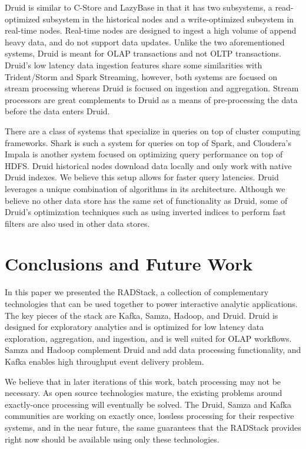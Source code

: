 \documentclass{vldb}
\begin{document}
Druid is similar to C-Store\cite{stonebraker2005c} and
LazyBase\cite{cipar2012lazybase} in that it has two subsystems, a
read-optimized subsystem in the historical nodes and a write-optimized
subsystem in real-time nodes. Real-time nodes are designed to ingest a high
volume of append heavy data, and do not support data updates. Unlike the two
aforementioned systems, Druid is meant for OLAP transactions and not OLTP
transactions. Druid’s low latency data ingestion features share some
similarities with Trident/Storm\cite{marz2013storm} and Spark
Streaming\cite{zaharia2012discretized}, however, both systems are focused on
stream processing whereas Druid is focused on ingestion and aggregation. Stream
processors are great complements to Druid as a means of pre-processing the data
before the data enters Druid. 

There are a class of systems that specialize in queries on top of cluster
computing frameworks. Shark\cite{engle2012shark} is such a system for queries
on top of Spark, and Cloudera’s Impala\cite{cloudera2013} is another system
focused on optimizing query performance on top of HDFS. Druid historical nodes
download data locally and only work with native Druid indexes. We believe this
setup allows for faster query latencies. Druid leverages a unique combination
of algorithms in its architecture. Although we believe no other data store has
the same set of functionality as Druid, some of Druid’s optimization techniques
such as using inverted indices to perform fast filters are also used in other
data stores\cite{macnicol2004sybase}. 

\section{Conclusions and Future Work}
\label{sec:conclusions}
In this paper we presented the RADStack, a collection of complementary
technologies that can be used together to power interactive analytic
applications. The key pieces of the stack are Kafka, Samza, Hadoop, and Druid.
Druid is designed for exploratory analytics and is optimized for low latency
data exploration, aggregation, and ingestion, and is well suited for OLAP
workflows. Samza and Hadoop complement Druid and add data processing
functionality, and Kafka enables high throughput event delivery problem. 

We believe that in later iterations of this work, batch processing may not be
necessary. As open source technologies mature, the existing problems around
exactly-once processing will eventually be solved. The Druid, Samza and Kafka
communities are working on exactly once, lossless processing for their
respective systems, and in the near future, the same guarantees that the
RADStack provides right now should be available using only these technologies.
\end{document}
